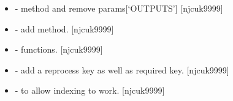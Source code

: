 \documentclass[a4paper,10pt,english]{report}
\begin{document}
\begin{itemize}
\item {} 
 -  method and remove
params{[}‘OUTPUTS’{]} {[}njcuk9999{]}

\item {} 
 - add  method. {[}njcuk9999{]}

\item {} 
 -  
functions. {[}njcuk9999{]}

\item {} 
 - add a reprocess key as well as required
key. {[}njcuk9999{]}

\item {} 
 -  to allow indexing to work.
{[}njcuk9999{]}

\end{itemize}
\end{document}
